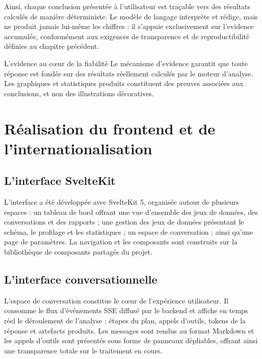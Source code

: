 Ainsi, chaque conclusion présentée à l'utilisateur est traçable vers des résultats calculés de manière déterministe. Le modèle de langage interprète et rédige, mais ne produit jamais lui-même les chiffres : il s'appuie exclusivement sur l'evidence accumulée, conformément aux exigences de transparence et de reproductibilité définies au chapitre précédent.

\begin{resultbox}{L'evidence au cœur de la fiabilité}
Le mécanisme d'evidence garantit que toute réponse est fondée sur des résultats réellement calculés par le moteur d'analyse. Les graphiques et statistiques produits constituent des preuves associées aux conclusions, et non des illustrations décoratives.
\end{resultbox}

\section{Réalisation du frontend et de l'internationalisation}

\subsection{L'interface SvelteKit}

L'interface a été développée avec SvelteKit 5, organisée autour de plusieurs espaces : un tableau de bord offrant une vue d'ensemble des jeux de données, des conversations et des rapports ; une gestion des jeux de données présentant le schéma, le profilage et les statistiques ; un espace de conversation ; ainsi qu'une page de paramètres. La navigation et les composants sont construits sur la bibliothèque de composants partagés du projet.

\subsection{L'interface conversationnelle}

L'espace de conversation constitue le cœur de l'expérience utilisateur. Il consomme le flux d'événements SSE diffusé par le backend et affiche en temps réel le déroulement de l'analyse : étapes du plan, appels d'outils, tokens de la réponse et artefacts produits. Les messages sont rendus au format Markdown et les appels d'outils sont présentés sous forme de panneaux dépliables, offrant ainsi une transparence totale sur le traitement en cours.

